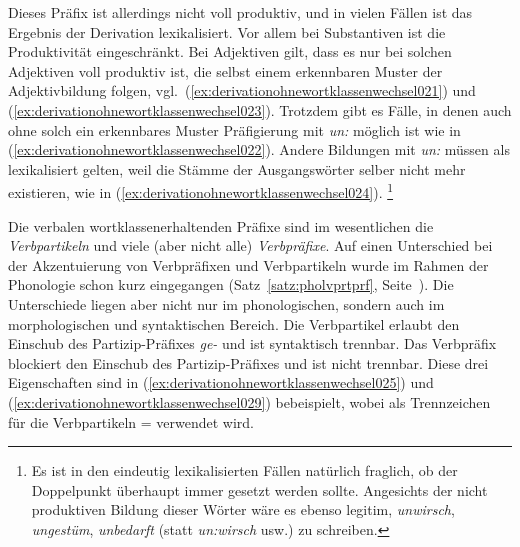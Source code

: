 Dieses Präfix ist allerdings nicht voll produktiv, und in vielen Fällen ist das Ergebnis der Derivation lexikalisiert.
Vor allem bei Substantiven ist die Produktivität eingeschränkt.
Bei Adjektiven gilt, dass es nur bei solchen Adjektiven voll produktiv ist, die selbst einem erkennbaren Muster der Adjektivbildung folgen, vgl.\ (\ref{ex:derivationohnewortklassenwechsel021}) und (\ref{ex:derivationohnewortklassenwechsel023}).
Trotzdem gibt es Fälle, in denen auch ohne solch ein erkennbares Muster Präfigierung mit \textit{un:} möglich ist wie in (\ref{ex:derivationohnewortklassenwechsel022}).
Andere Bildungen mit \textit{un:} müssen als lexikalisiert gelten, weil die Stämme der Ausgangswörter selber nicht mehr existieren, wie in (\ref{ex:derivationohnewortklassenwechsel024}).%
\footnote{Es ist in den eindeutig lexikalisierten Fällen natürlich fraglich, ob der Doppelpunkt überhaupt immer gesetzt werden sollte.
Angesichts der nicht produktiven Bildung dieser Wörter wäre es ebenso legitim, \textit{unwirsch}, \textit{ungestüm}, \textit{unbedarft} (statt \textit{un:wirsch} usw.) zu schreiben.}

\begin{exe}
  \ex\label{ex:derivationohnewortklassenwechsel021}
    \begin{xlist}
  \end{xlist}
  \ex\label{ex:derivationohnewortklassenwechsel023}
  \begin{xlist}
  \end{xlist}
  \ex\label{ex:derivationohnewortklassenwechsel024}
  \begin{xlist}
  \end{xlist}
\end{exe}


Die verbalen wortklassenerhaltenden Präfixe sind im wesentlichen die \textit{Verbpartikeln} und viele (aber nicht alle) \textit{Verbpräfixe}.
Auf einen Unterschied bei der Akzentuierung von Verbpräfixen und Verbpartikeln wurde im Rahmen der Phonologie schon kurz eingegangen (Satz~\ref{satz:pholvprtprf}, Seite~\pageref{satz:pholvprtprf}).
Die Unterschiede liegen aber nicht nur im phonologischen, sondern auch im morphologischen und syntaktischen Bereich.
Die Verbpartikel erlaubt den Einschub des Partizip-Präfixes \textit{ge-} und ist syntaktisch trennbar.
Das Verbpräfix blockiert den Einschub des Partizip-Präfixes und ist nicht trennbar.
Diese drei Eigenschaften sind in (\ref{ex:derivationohnewortklassenwechsel025}) und (\ref{ex:derivationohnewortklassenwechsel029}) bebeispielt, wobei als Trennzeichen für die Verbpartikeln = verwendet wird.

